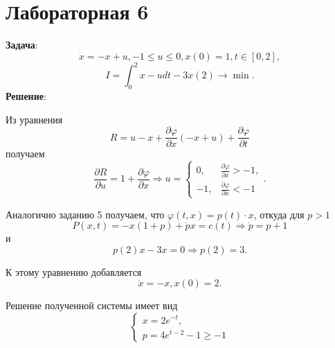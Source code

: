 \documentclass[a4paper, 12pt]{article}
\newcommand{\df}[2]{\frac{\partial #1}{\partial #2}}
\begin{document}
\section{Лабораторная 6}
{\bf Задача}:
\begin{equation}
    \dot x = -x+u , -1\leq u \leq 0, x(0)=1, t \in [0,2],
\end{equation}
\begin{equation}
    I=\int_0^2 x-u dt - 3x(2) \rightarrow \min.
\end{equation}
{\bf Решение}:

Из уравнения
\begin{equation}
    R=u-x +\df{\varphi}{x}(-x+u)+\df{\varphi}{t}
\end{equation}
получаем
\begin{equation}
    \df{R}{u}=1+\df{\varphi}{x} \Rightarrow u=
    \begin{cases}
        0,&\df{\varphi}{x} >-1,\\
        -1,&\df{\varphi}{x}<-1
    \end{cases}.
\end{equation}

Аналогично заданию 5 получаем, что $\varphi(t,x)=p(t)\cdot x$, откуда для $p>1$
\begin{equation}
    P(x,t)=-x(1+p)+\dot p x=c(t) \Rightarrow \dot p=p+1
\end{equation}
и
\begin{equation}
    p(2)x-3x=0 \Rightarrow p(2)=3.
\end{equation}

К этому уравнению добавляется
\begin{equation}
    \dot x=-x, x(0)=2.
\end{equation}

Решение полученной системы имеет вид
\begin{equation}
    \begin{cases}
        x=2 e^{-t},\\
        p=4 e^{t-2}-1 \geq -1
    \end{cases}
\end{equation}
\end{document}
